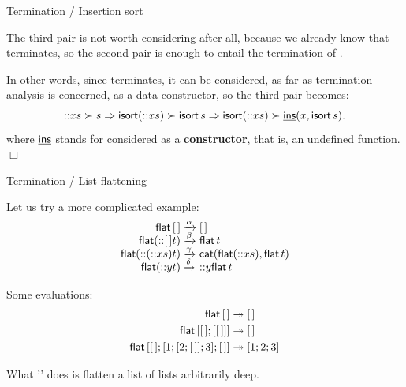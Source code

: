 %
\begin{frame}{Termination / Insertion sort}

  The third pair is not worth considering after all, because we
  already know that  terminates, so the second pair is
  enough to entail the termination of .

  \bigskip

  In other words, since  terminates, it can be considered,
  as far as termination analysis is concerned, as a data constructor,
  so the third pair becomes:
  \begin{equation*}
    \textsf{::}{x}{s} \succ s
    \Rightarrow
    \textsf{isort}(\textsf{::}{x}{s}) \succ \textsf{isort}\,s
    \Rightarrow
    \textsf{isort}(\textsf{::}{x}{s}) \succ \underline{\textsf{ins}}(x, \textsf{isort}\,s).
  \end{equation*}
  where \(\textsf{\underline{\textsf{ins}}}\) stands for  considered as a
  \textbf{constructor}, that is, an undefined function.\hfill\(\Box\)

\end{frame}

%
\begin{frame}{Termination / List flattening}

   Let us try a more complicated example:
   \begin{equation*}
     \begin{array}{r@{\;}l@{\;}l}
       \fun{flat}\,\el                   & \smashedrightarrow{\alpha}
       & \el\\
       \fun{flat}(\cons{\el}{t})         & \smashedrightarrow{\beta}
       & \fun{flat}\,t\\
       \fun{flat}(\cons{(\cons{x}{s})}{t}) & \smashedrightarrow{\gamma}
       & \fun{cat}(\fun{flat}(\cons{x}{s}),\fun{flat}\,t)\\
       \fun{flat}(\cons{y}{t})           & \smashedrightarrow{\delta}
       & \cons{y}{\fun{flat}\,t}
     \end{array}
   \end{equation*}

   Some evaluations:
   \begin{align*}
     \textsf{flat}\,[\,] & \twoheadrightarrow [\,]\\
     \textsf{flat}\,[[\,];[[\,]]] & \twoheadrightarrow [\,]\\
     \textsf{flat}\,[[\,];[1;[2;[\,]];3];[\,]] & \twoheadrightarrow [1;2;3]
   \end{align*}

   What '' does is flatten a list of lists arbitrarily
   deep.

\end{frame}

